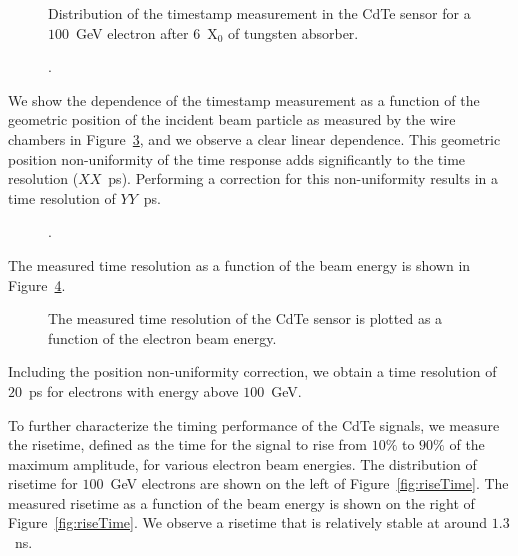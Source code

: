 \documentclass[preprint,1p]{elsarticle}
\begin{document}
\begin{figure}[htbp] 
\centering
\caption{Distribution of the timestamp measurement in the CdTe sensor for a $100$~GeV
electron after $6$~$\mathrm{X}_{0}$ of tungsten absorber. } 
\label{fig:DeltaT} 
\end{figure} 


\begin{figure}[htbp] 
\centering
\caption{. } 
\label{fig:DeltaTVsAmplitude} 
\end{figure} 


We show the dependence of the timestamp measurement as a function of the geometric
position of the incident beam particle as measured by the wire chambers in 
Figure~\ref{fig:DeltaTVsBeamXY}, and we observe a clear linear dependence.
This geometric position non-uniformity of the time response adds significantly to the 
time resolution ($XX$~ps). Performing a correction for this non-uniformity results
in a time resolution of $YY$~ps. 

\begin{figure}[htbp] 
\centering
\caption{. } 
\label{fig:DeltaTVsBeamXY} 
\end{figure} 


The measured time resolution as a function of the beam energy is shown in
Figure~\ref{fig:ChargeVsEnergy}.

\begin{figure}[htbp] 
\centering
\caption{ The measured time resolution of the CdTe sensor is plotted as a function
of the electron beam energy. } 
\label{fig:ChargeVsEnergy} 
\end{figure} 

Including the position non-uniformity correction, we obtain a time resolution of $20$~ps
for electrons with energy above $100$~GeV. 


To further characterize the timing performance of the CdTe signals, we measure the
risetime, defined as the time for the signal to rise from $10\%$ to $90\%$ of the maximum
amplitude, for various electron beam energies. The distribution of risetime for
$100$~GeV electrons are shown on the left of Figure~\ref{fig:riseTime}. The 
measured risetime as a function of the beam energy is shown on the right of 
Figure~\ref{fig:riseTime}. We observe a risetime that is relatively stable
at around $1.3$~ns.
\end{document}

